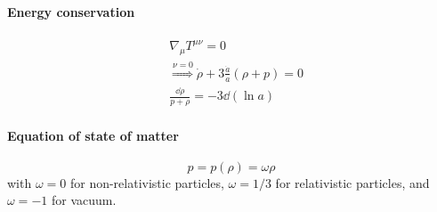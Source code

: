 \documentclass[12pt, a4paper, DIV=15]{article}
\numberwithin{equation}{section}
\begin{document}
\paragraph{Energy conservation}
\begin{align}
   &\nabla_\mu T^{\mu \nu} = 0 \\
   &\stackrel{\nu=0}{\Rightarrow} \dot{\rho} + 3 \frac{\dot{a}}{a} (\rho + p) = 0 \\
   & \frac{\dd{\rho}}{p + \rho} = -3 \dd{(\ln a)} \label{Econs}
\end{align}

\paragraph{Equation of state of matter}
\begin{equation}
   p = p(\rho) = \omega \rho
\end{equation}
with $\omega = 0$ for non-relativistic particles, $\omega=1/3$ for relativistic particles, and $\omega = -1$ for vacuum.
\end{document}
